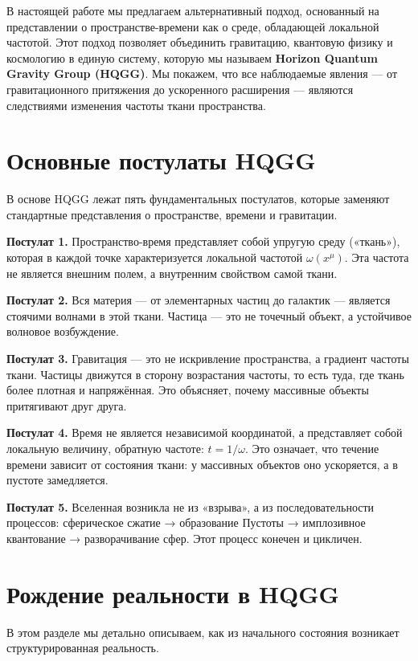 \documentclass[12pt,a4paper]{article}
\begin{document}
В настоящей работе мы предлагаем альтернативный подход, основанный на представлении о пространстве-времени как о среде, обладающей локальной частотой. Этот подход позволяет объединить гравитацию, квантовую физику и космологию в единую систему, которую мы называем \textbf{Horizon Quantum Gravity Group (HQGG)}. Мы покажем, что все наблюдаемые явления — от гравитационного притяжения до ускоренного расширения — являются следствиями изменения частоты ткани пространства.

\section{Основные постулаты HQGG}

В основе HQGG лежат пять фундаментальных постулатов, которые заменяют стандартные представления о пространстве, времени и гравитации.

\textbf{Постулат 1.} Пространство-время представляет собой упругую среду («ткань»), которая в каждой точке характеризуется локальной частотой \(\omega(x^\mu)\). Эта частота не является внешним полем, а внутренним свойством самой ткани.

\textbf{Постулат 2.} Вся материя — от элементарных частиц до галактик — является стоячими волнами в этой ткани. Частица — это не точечный объект, а устойчивое волновое возбуждение.

\textbf{Постулат 3.} Гравитация — это не искривление пространства, а градиент частоты ткани. Частицы движутся в сторону возрастания частоты, то есть туда, где ткань более плотная и напряжённая. Это объясняет, почему массивные объекты притягивают друг друга.

\textbf{Постулат 4.} Время не является независимой координатой, а представляет собой локальную величину, обратную частоте: \(t = 1/\omega\). Это означает, что течение времени зависит от состояния ткани: у массивных объектов оно ускоряется, а в пустоте замедляется.

\textbf{Постулат 5.} Вселенная возникла не из «взрыва», а из последовательности процессов: сферическое сжатие → образование Пустоты → имплозивное квантование → разворачивание сфер. Этот процесс конечен и цикличен.

\section{Рождение реальности в HQGG}

В этом разделе мы детально описываем, как из начального состояния возникает структурированная реальность.
\end{document}
